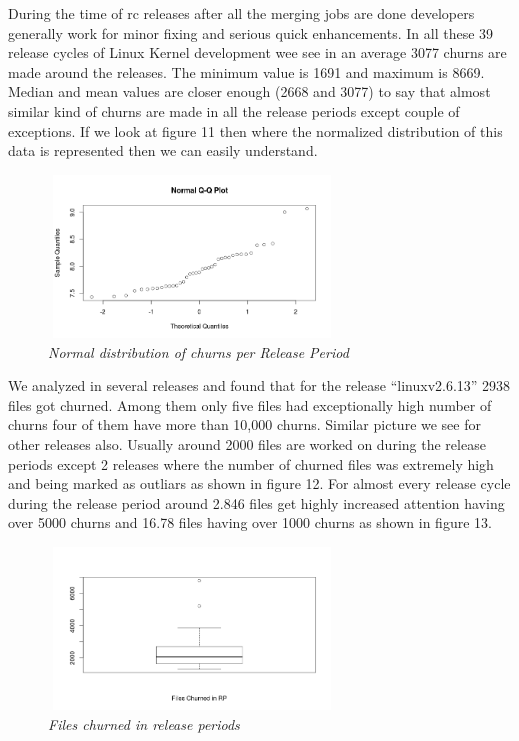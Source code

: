 \documentclass{acm_proc_article-sp}
\begin{document}
During the time of rc releases after all the merging jobs are done developers generally work for minor fixing and serious quick enhancements. In all these 39 release cycles of Linux Kernel development wee see in an average 3077 churns are made around the releases. The minimum value is 1691 and maximum is 8669. Median and mean values are closer enough (2668 and 3077) to say that almost similar kind of churns are made in all the release periods except couple of exceptions. If we look at figure 11 then where the normalized distribution of this data is represented then we can easily understand.
\begin{figure}
\begin{center}
\includegraphics[height=1.7in,width=3in]{churnRPnorm.png}
\caption{\small \sl Normal distribution of churns per Release Period}
\end{center}
\end{figure}

We analyzed in several releases and found that for the release ``linuxv2.6.13'' 2938 files got churned. Among them only five files had exceptionally high number of churns four of them have more than 10,000 churns. Similar picture we see for other releases also. Usually around 2000 files are worked on during the release periods except 2 releases where the number of churned files was extremely high and being marked as outliars as shown in figure 12. For almost every release cycle during the release period around 2.846 files get highly increased attention having over 5000 churns and 16.78 files having over 1000 churns as shown in figure 13.
\begin{figure}
\begin{center}
\includegraphics[height=1.7in,width=3in]{fileChurnRPbox.png}
\caption{\small \sl Files churned in release periods}
\end{center}
\end{figure}
\end{document}
